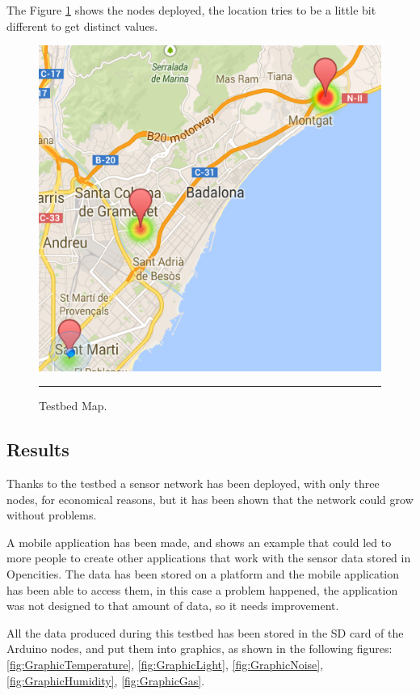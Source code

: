 \documentclass[12pt, a4paper,twoside]{tesi_upf}
\begin{document}
    The Figure \ref{fig:Testbedmap} shows the nodes deployed, the location tries to be a little bit different to get distinct values.
    \begin{figure}[htbp]
      \centering
          \includegraphics[scale=0.2]{./Figures/Testbedmap.png}
          \\
          \rule{15em}{0.5pt}
      \caption[Testbed Map]{Testbed Map.}
      \label{fig:Testbedmap}
    \end{figure}
    
    \subsection{Results}
      
      Thanks to the testbed a sensor network has been deployed, with only three nodes, for economical reasons, but it has been shown that the network could grow without problems.    
      
      A mobile application has been made, and shows an example that could led to more people to create other applications that work with the sensor data stored in Opencities. 
      The data has been stored on a platform and the mobile application has been able to access them, in this case a problem happened, the application was not designed to that amount of data, so it needs improvement.

      All the data produced during this testbed has been stored in the SD card of the Arduino nodes, and put them into graphics, as shown in the following figures: \ref{fig:GraphicTemperature}, \ref{fig:GraphicLight}, \ref{fig:GraphicNoise}, \ref{fig:GraphicHumidity}, \ref{fig:GraphicGas}.
      
\end{document}

